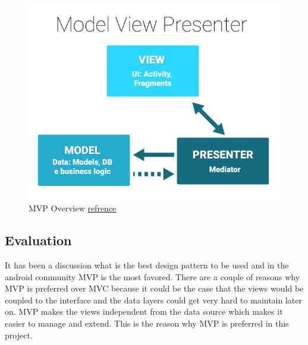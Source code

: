         \begin{figure}[htbp!]
            \centering \includegraphics[scale=0.5]{grafiken/mvp.jpg}
            \caption{MVP Overview 
            \href{https://cms-assets.tutsplus.com/uploads/users/1308/posts/26206/image/MVP-Android.png}{refrence}}
            \label{fig:mvpOverview}
        \end{figure}

    \subsection{Evaluation}
        It has been a discussion what is the best design pattern to be used and in the 
        android community MVP is the most favored. There are a couple of reasons why 
        MVP is preferred over MVC because it could be the case that the views would be
        coupled to the interface and the data layers could get very hard to maintain
        later on. MVP makes the views independent from the data source which makes it
        easier to manage and extend. This is the reason why MVP is preferred in
        this project.



